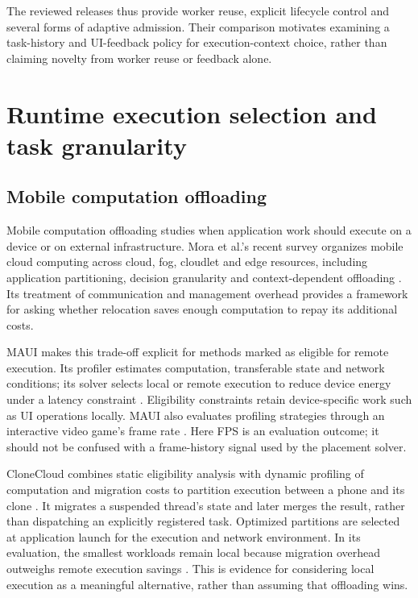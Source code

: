 \documentclass[14pt,a4paper,oneside]{extreport}
\begin{document}
The reviewed releases thus provide worker reuse, explicit lifecycle control and several forms
of adaptive admission. Their comparison motivates examining a task-history and UI-feedback
policy for execution-context choice, rather than claiming novelty from worker reuse or
feedback alone.

\section{Runtime execution selection and task granularity}
\label{runtime-execution-selection-and-task-granularity}

\subsection{Mobile computation offloading}
\label{mobile-computation-offloading}

Mobile computation offloading studies when application work should execute on a device or
on external infrastructure. Mora et al.'s recent survey organizes mobile cloud computing
across cloud, fog, cloudlet and edge resources, including application partitioning,
decision granularity and context-dependent offloading \citep{mora2024}. Its treatment of
communication and management overhead provides a framework for asking whether relocation
saves enough computation to repay its additional costs.

MAUI makes this trade-off explicit for methods marked as eligible for remote execution.
Its profiler estimates computation, transferable state and network conditions; its solver
selects local or remote execution to reduce device energy under a latency constraint
\citep[Secs. 3--6]{maui2010}. Eligibility constraints retain device-specific work such as
UI operations locally. MAUI also evaluates profiling strategies through an interactive
video game's frame rate \citep[Sec. 5.2.1]{maui2010}. Here FPS is an evaluation outcome;
it should not be confused with a frame-history signal used by the placement solver.

CloneCloud combines static eligibility analysis with dynamic profiling of computation
and migration costs to partition execution between a phone and its clone
\citep[Secs. 3--4]{clonecloud2011}. It migrates a suspended thread's state and later merges
the result, rather than dispatching an explicitly registered task. Optimized partitions
are selected at application launch for the execution and network environment. In its
evaluation, the smallest workloads remain local because migration overhead outweighs
remote execution savings \citep[Sec. 6]{clonecloud2011}. This is evidence for considering
local execution as a meaningful alternative, rather than assuming that offloading wins.
\end{document}
